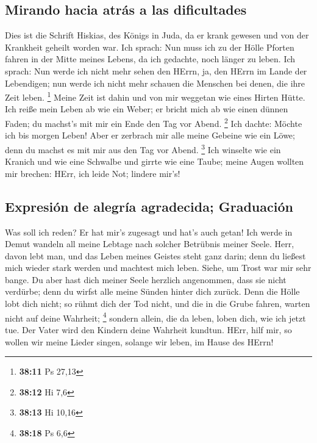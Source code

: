 \hypertarget{mirando-hacia-atruxe1s-a-las-dificultades}{%
\subsection{Mirando hacia atrás a las
dificultades}\label{mirando-hacia-atruxe1s-a-las-dificultades}}

 Dies ist die Schrift Hiskias, des Königs in Juda, da er
krank gewesen und von der Krankheit geheilt worden war. 
Ich sprach: Nun muss ich zu der Hölle Pforten fahren in der Mitte meines
Lebens, da ich gedachte, noch länger zu leben.  Ich
sprach: Nun werde ich nicht mehr sehen den HErrn, ja, den HErrn im Lande
der Lebendigen; nun werde ich nicht mehr schauen die Menschen bei denen,
die ihre Zeit leben. \footnote{\textbf{38:11} Ps 27,13} 
Meine Zeit ist dahin und von mir weggetan wie eines Hirten Hütte. Ich
reiße mein Leben ab wie ein Weber; er bricht mich ab wie einen dünnen
Faden; du machst's mit mir ein Ende den Tag vor Abend. \footnote{\textbf{38:12}
  Hi 7,6}  Ich dachte: Möchte ich bis morgen Leben! Aber
er zerbrach mir alle meine Gebeine wie ein Löwe; denn du machst es mit
mir aus den Tag vor Abend. \footnote{\textbf{38:13} Hi 10,16}
 Ich winselte wie ein Kranich und wie eine Schwalbe und
girrte wie eine Taube; meine Augen wollten mir brechen: HErr, ich leide
Not; lindere mir's!

\hypertarget{expresiuxf3n-de-alegruxeda-agradecida-graduaciuxf3n}{%
\subsection{Expresión de alegría agradecida;
Graduación}\label{expresiuxf3n-de-alegruxeda-agradecida-graduaciuxf3n}}

 Was soll ich reden? Er hat mir's zugesagt und hat's auch
getan! Ich werde in Demut wandeln all meine Lebtage nach solcher
Betrübnis meiner Seele.  Herr, davon lebt man, und das
Leben meines Geistes steht ganz darin; denn du ließest mich wieder stark
werden und machtest mich leben.  Siehe, um Trost war mir
sehr bange. Du aber hast dich meiner Seele herzlich angenommen, dass sie
nicht verdürbe; denn du wirfst alle meine Sünden hinter dich zurück.
 Denn die Hölle lobt dich nicht; so rühmt dich der Tod
nicht, und die in die Grube fahren, warten nicht auf deine Wahrheit;
\footnote{\textbf{38:18} Ps 6,6}  sondern allein, die da
leben, loben dich, wie ich jetzt tue. Der Vater wird den Kindern deine
Wahrheit kundtun.  HErr, hilf mir, so wollen wir meine
Lieder singen, solange wir leben, im Hause des HErrn!

